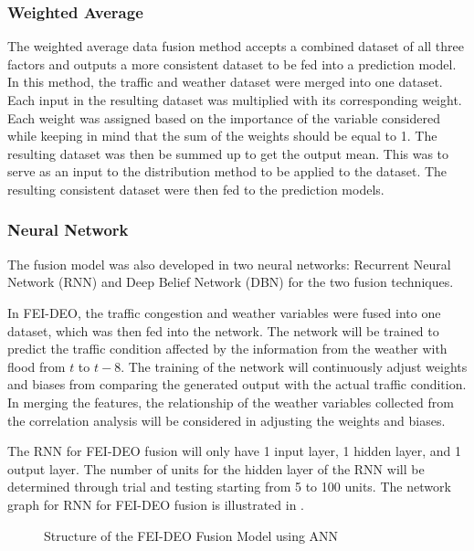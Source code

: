 \subsubsection{Weighted Average} 
The weighted average data fusion method accepts a combined dataset of all three factors and outputs a more consistent dataset to be fed into a prediction model. In this method, the traffic and weather dataset were merged into one dataset. Each input in the resulting dataset was multiplied with its corresponding weight. Each weight was assigned based on the importance of the variable considered while keeping in mind that the sum of the weights should be equal to 1. The resulting dataset was then be summed up to get the output mean. This was to serve as an input to the distribution method to be applied to the dataset. The resulting consistent dataset were then fed to the prediction models.

\subsubsection{Neural Network}
The fusion model was also developed in two neural networks: Recurrent Neural Network (RNN) and Deep Belief Network (DBN) for the two fusion techniques.

In FEI-DEO, the traffic congestion and weather variables were fused into one dataset, which was then fed into the network. The network will be trained to predict the traffic condition affected by the information from the weather with flood from $t$ to $t-8$. The training of the network will continuously adjust weights and biases from comparing the generated output with the actual traffic condition. In merging the features, the relationship of the weather variables collected from the correlation analysis will be considered in adjusting the weights and biases. 

The RNN for FEI-DEO fusion will only have 1 input layer, 1 hidden layer, and 1 output layer. The number of units for the hidden layer of the RNN will be determined through trial and testing starting from 5 to 100 units. The network graph for RNN for FEI-DEO fusion is illustrated in . 
\begin{figure}[h]
	\centering
	\captionsetup{justification=centering}
	\caption{Structure of the FEI-DEO Fusion Model using ANN}
	\label{fig:feideo_ann}
\end{figure}

